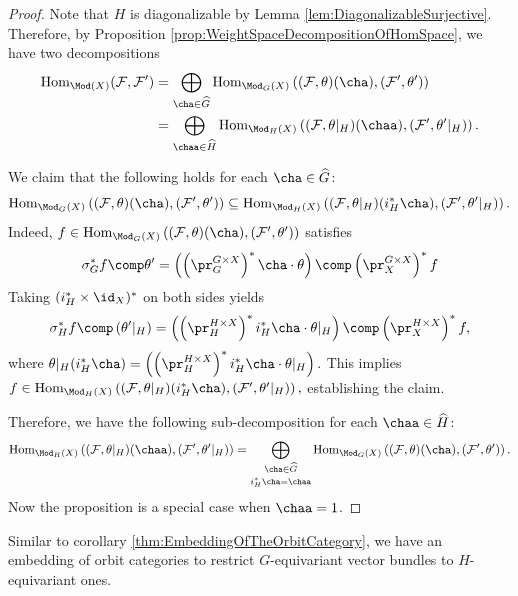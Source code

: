 \begin{proof}
Note that $H$ is diagonalizable
by Lemma \ref{lem:DiagonalizableSurjective}.
Therefore,
by Proposition \ref{prop:WeightSpaceDecompositionOfHomSpace},
we have two decompositions
\begin{align*}
\operatorname{Hom}_{\Mod(X)}(\mathcal{F}, \mathcal{F}') 
&=
\bigoplus_{\cha \in \widehat{G}} \operatorname{Hom}_{\Mod_G(X)}\left( (\mathcal{F}, \theta)(\cha), (\mathcal{F}', \theta') \right)
\\
&=
\bigoplus_{\chaa \in \widehat{H}} \operatorname{Hom}_{\Mod_H(X)}\left( (\mathcal{F}, \theta|_H)(\chaa), (\mathcal{F}', \theta'|_H) \right).
\end{align*}



We claim that
the following holds for each $\cha\in\widehat{G}$:
$$
\operatorname{Hom}_{\Mod_G(X)}\left( (\mathcal{F}, \theta)(\cha), (\mathcal{F}', \theta') \right)
\subseteq
\operatorname{Hom}_{\Mod_H(X)}\left( (\mathcal{F}, \theta|_H)(i_H^*\cha), (\mathcal{F}', \theta'|_H) \right).
$$
Indeed,
$
f\in\operatorname{Hom}_{\Mod_G(X)}\left( (\mathcal{F}, \theta)(\cha), (\mathcal{F}', \theta') \right)
$
satisfies
$$
\sigma_G^* f\comp \theta'
=
\left(\left(\pr_G^{G\times X}\right)^*\cha \cdot \theta\right)
\comp
\left(\pr_X^{G\times X}\right)^* f
$$
Taking $(i_H^*\times \id_X)^*$
on both sides yields
$$
\sigma_H^*f\comp\left(\theta'|_H\right)
=
\left(
\left(\pr_H^{H\times X}\right)^*
i_H^*\cha
\cdot
\theta|_H
\right)
\comp
\left(\pr_X^{H\times X}\right)^*f,
$$
where
$
\theta|_H
(i_H^*\cha)
=
\left(
\left(\pr_H^{H\times X}\right)^*
i_H^*\cha
\cdot
\theta|_H
\right).
$
This implies
$
f\in
\operatorname{Hom}_{\Mod_H(X)}\left( (\mathcal{F}, \theta|_H)(i_H^*\cha), (\mathcal{F}', \theta'|_H) \right),
$
establishing the claim.


Therefore,
we have the following sub-decomposition
for each $\chaa\in\widehat{H}$:
$$
\operatorname{Hom}_{\Mod_H(X)}\left( (\mathcal{F}, \theta|_H)(\chaa), (\mathcal{F}', \theta'|_H) \right)
=
\bigoplus_{\substack{\cha \in \widehat{G} \\[1mm] i_H^*\cha = \chaa}} \operatorname{Hom}_{\Mod_G(X)}\left( (\mathcal{F}, \theta)(\cha), (\mathcal{F}', \theta') \right).
$$
Now the proposition is a special case when $\chaa=1$.
\end{proof}
Similar to corollary \ref{thm:EmbeddingOfTheOrbitCategory}, we have an embedding of orbit categories to restrict $G$-equivariant vector bundles to $H$-equivariant ones.
